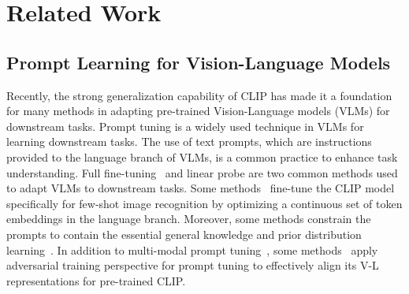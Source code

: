 \section{Related Work}
\subsection{Prompt Learning for Vision-Language Models}
Recently, the strong generalization capability of CLIP has made it a foundation for many methods in adapting pre-trained Vision-Language models (VLMs) for downstream tasks. 
Prompt tuning is a widely used technique in VLMs for learning downstream tasks. 
The use of text prompts, which are instructions provided to the language branch of VLMs, is a common practice to enhance task understanding. Full fine-tuning~\cite{cao2024controlled} and linear probe are two common methods used to adapt VLMs to downstream tasks. %
Some methods~\cite{zhou2022learning,zhou2022conditional,yao2023tcp} fine-tune the CLIP model specifically for few-shot image recognition by optimizing a continuous set of token embeddings in the language branch. 
Moreover, some methods
constrain the prompts to contain the essential general knowledge and prior distribution learning~\cite{lu2022prompt}. 
In addition to multi-modal prompt tuning~\cite{lee2023multimodal,khattak2023maple,khattak2023self}, some methods~\cite{zhou2024few,li2024one} apply adversarial training perspective for prompt tuning to effectively align its V-L representations for pre-trained CLIP.